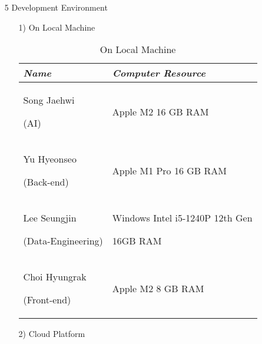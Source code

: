 \documentclass[conference]{IEEEtran}
\begin{document}
   \begin{enumerate}
    \item[5] Development Environment\par
    \vspace{0.3em}

    \begin{itemize}
        \item [1)] On Local Machine\par
        \vspace{0.3em}

        \begin{table} [htp]
            \caption{On Local Machine}
            \centering
            \renewcommand{\arraystretch}{1.4}
            \begin{tabular}{|p{2.6cm}|p{4.4cm}|}
            \hline
                \textit{\textbf{Name}} & \textit{\textbf{Computer Resource}} \\
            \hline
                Song Jaehwi\par(AI) & Apple M2 16 GB RAM \\
            \hline
                Yu Hyeonseo\par(Back-end) & Apple M1 Pro 16 GB RAM \\
            \hline 
                Lee Seungjin\par(Data-Engineering) & Windows Intel i5-1240P 12th Gen\par 16GB RAM \\
            \hline
                Choi Hyungrak\par(Front-end) & Apple M2 8 GB RAM \\
            \hline
            \end{tabular}
        \end{table}

        \vspace{0.5em}

        \item [2)] Cloud Platform\par
        \vspace{0.3em}


\end{itemize}
\end{enumerate}
\end{document}
